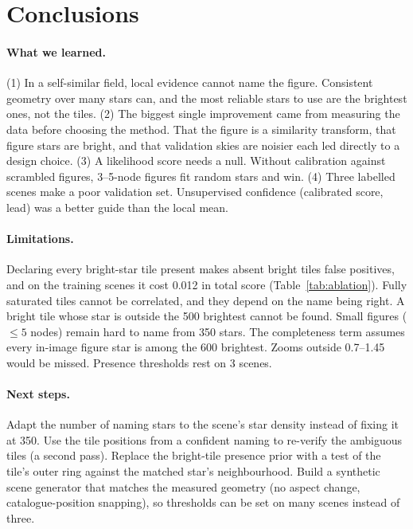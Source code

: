 \documentclass[a4paper,11pt]{article}
\begin{document}
\section{Conclusions}

\paragraph{What we learned.} (1) In a self-similar field, local evidence cannot name the figure. Consistent geometry
over many stars can, and the most reliable stars to use are the brightest ones, not the tiles. (2) The
biggest single improvement came from measuring the data before choosing the method. That the figure is a similarity
transform, that figure stars are bright, and that validation skies are noisier each led directly to a design choice.
(3) A likelihood score needs a null. Without calibration against scrambled figures, 3--5-node figures fit random stars
and win. (4) Three labelled scenes make a poor validation set. Unsupervised confidence (calibrated score, lead) was a
better guide than the local mean.

\paragraph{Limitations.} Declaring every bright-star tile present makes absent bright tiles false positives, and on
the training scenes it cost 0.012 in total score (Table~\ref{tab:ablation}). Fully saturated tiles cannot be correlated, and they depend on the name being right. A bright tile
whose star is outside the 500 brightest cannot be found. Small figures ($\le5$ nodes) remain hard to name from 350
stars. The completeness term assumes every in-image figure star is among the 600 brightest. Zooms outside 0.7--1.45 would be missed.
Presence thresholds rest on 3 scenes.

\paragraph{Next steps.} Adapt the number of naming stars to the scene's star density instead of fixing it at 350. Use
the tile positions from a confident naming to re-verify the ambiguous tiles (a second pass). Replace the bright-tile
presence prior with a test of the tile's outer ring against the matched star's neighbourhood. Build a synthetic scene
generator that matches the measured geometry (no aspect change, catalogue-position snapping), so thresholds can be set
on many scenes instead of three.
\end{document}
